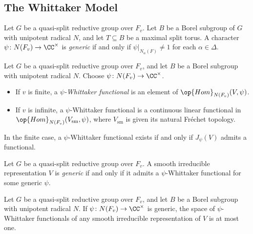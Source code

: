 \documentclass{article}
\begin{document}
\subsection{The Whittaker Model}
\begin{definition}[generic]
	Let $G$ be a quasi-split reductive group over $F_v$. Let $B$ be a Borel subgroup of $G$ with unipotent radical $N$, and let $T\subseteq B$ be a maximal split torus. A character $\psi\colon N(F_v)\to\CC^\times$ is \textit{generic} if and only if $\psi|_{N_\alpha(F)}\ne1$ for each $\alpha\in\Delta$.
\end{definition}
\begin{definition}
	Let $G$ be a quasi-split reductive group over $F_v$, and let $B$ be a Borel subgroup with unipotent radical $N$. Choose $\psi\colon N(F_v)\to\CC^\times$.
	\begin{itemize}
		\item If $v$ is finite, a \textit{$\psi$-Whittaker functional} is an element of $\op{Hom}_{N(F_v)}(V,\psi)$.
		\item If $v$ is infinite, a $\psi$-Whittaker functional is a continuous linear functional in $\op{Hom}_{N(F_v)}(V_{\mathrm{sm}},\psi)$, where $V_{\mathrm{sm}}$ is given its natural Fr\'echet topology.
	\end{itemize}
\end{definition}
\begin{remark}
	In the finite case, a $\psi$-Whittaker functional exists if and only if $J_\psi(V)$ admits a functional.
\end{remark}
\begin{definition}[generic]
	Let $G$ be a quasi-split reductive group over $F_v$. A smooth irreducible representation $V$ is \textit{generic} if and only if it admits a $\psi$-Whittaker functional for some generic $\psi$.
\end{definition}
\begin{theorem}
	Let $G$ be a quasi-split reductive group over $F_v$, and let $B$ be a Borel subgroup with unipotent radical $N$. If $\psi\colon N(F_v)\to\CC^\times$ is generic, the space of $\psi$-Whittaker functionals of any smooth irreducible representation of $V$ is at most one.
\end{theorem}
\end{document}

